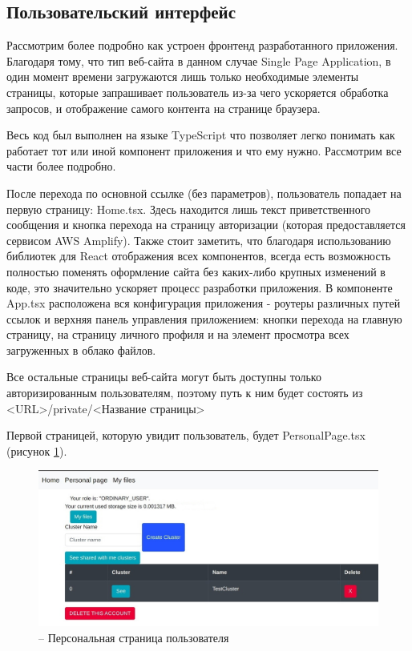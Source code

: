 \noindent 

\subsection{Пользовательский интерфейс}

Рассмотрим более подробно как устроен фронтенд разработанного приложения. Благодаря тому, что тип веб-сайта в данном случае Single Page Application, в один момент времени загружаются лишь только необходимые элементы страницы, которые запрашивает пользователь из-за чего ускоряется обработка запросов, и отображение самого контента на странице браузера.

Весь код был выполнен на языке TypeScript что позволяет легко понимать как работает тот или иной компонент приложения и что ему нужно. Рассмотрим все части более подробно.

После перехода по основной ссылке (без параметров), пользователь попадает на первую страницу: Home.tsx. Здесь находится лишь текст приветственного сообщения и кнопка перехода на страницу авторизации (которая предоставляется сервисом AWS Amplify). Также стоит заметить, что благодаря использованию библиотек для React отображения всех компонентов, всегда есть возможность полностью поменять оформление сайта без каких-либо крупных изменений в коде, это значительно ускоряет процесс разработки приложения.
В компоненте App.tsx расположена вся конфигурация приложения - роутеры различных путей ссылок и верхняя панель управления приложением: кнопки перехода на главную страницу, на страницу личного профиля и на элемент просмотра всех загруженных в облако файлов.

Все остальные страницы веб-сайта могут быть доступны только авторизированным пользователям, поэтому путь к ним будет состоять из <URL>/private/<Название страницы>

Первой страницей, которую увидит пользователь, будет PersonalPage.tsx (рисунок \ref{personalPage}).
\begin{figure}[H]
    \centering
    \includegraphics[scale=0.63]{images/ui/1_PersonalPage.jpg}
    \caption{-- Персональная страница пользователя}
    \label{personalPage}
\end{figure}

